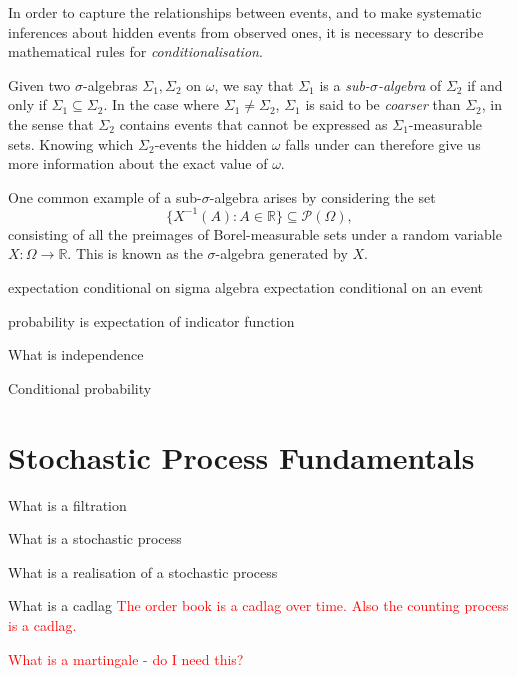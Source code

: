 \documentclass[honours,12pt]{unswthesis}
\numberwithin{equation}{section}
\begin{document}
In order to capture the relationships between events, and to make systematic inferences about hidden events from observed ones, it is necessary to describe mathematical rules for \textit{conditionalisation}.

Given two $\sigma$-algebras $\Sigma_1,\Sigma_2$ on $\omega$, we say that $\Sigma_1$ is a \textit{sub-$\sigma$-algebra} of $\Sigma_2$ if and only if $\Sigma_1\subseteq\Sigma_2$. In the case where $\Sigma_1\not=\Sigma_2$, $\Sigma_1$ is said to be \textit{coarser} than $\Sigma_2$, in the sense that $\Sigma_2$ contains events that cannot be expressed as $\Sigma_1$-measurable sets. Knowing which $\Sigma_2$-events the hidden $\omega$ falls under can therefore give us more information about the exact value of $\omega$.

One common example of a sub-$\sigma$-algebra arises by considering the set
$$\{X^{-1}(A) : A\in\mathbb{R}\}\subseteq\mathcal{P}(\Omega),$$
consisting of all the preimages of Borel-measurable sets under a random variable $X:\Omega\to\mathbb{R}$. This is known as the $\sigma$-algebra generated by $X$.

expectation conditional on sigma algebra
expectation conditional on an event

probability is expectation of indicator function

What is independence

Conditional probability

\section{Stochastic Process Fundamentals}
What is a filtration

What is a stochastic process

What is a realisation of a stochastic process

What is a cadlag \textcolor{red}{The order book is a cadlag over time. Also the counting process is a cadlag.}

\textcolor{red}{What is a martingale - do I need this?}





\clearpage
{}

\end{document}
